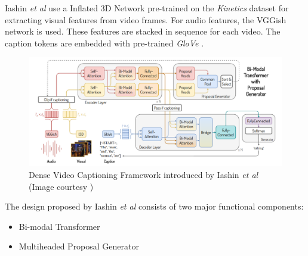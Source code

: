 \par Iashin \textit{et al} use a Inflated 3D Network pre-trained on the \textit{Kinetics} dataset
\cite{kay2017kinetics} for extracting visual features from video
frames. For audio features, the VGGish network \cite{vggish} is used. These features are stacked in 
sequence for each video. The caption tokens are embedded with pre-trained \textit{GloVe} \cite{glove}.

\begin{figure}[h]
	\includegraphics[width=\linewidth]{assets/img/bmt-architecture.png}
	\caption{Dense Video Captioning Framework introduced by Iashin \textit{et al} (Image courtesy \cite{iashin2020better})}
\end{figure}


\par The design proposed by Iashin \textit{et al} consists of two major functional components:
\begin{itemize}
\item Bi-modal Transformer
\item Multiheaded Proposal Generator
\end{itemize}

